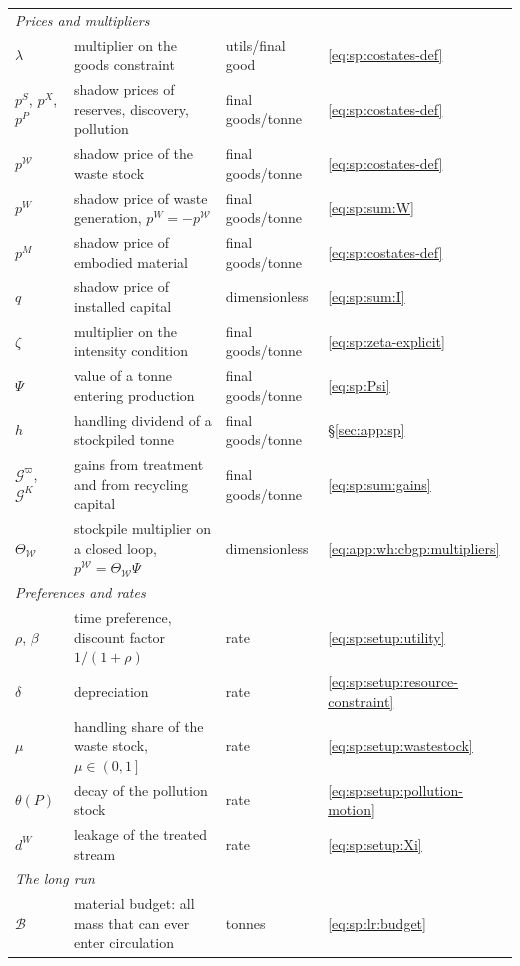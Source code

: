 \begin{center}
\begin{tabular}{llll}
\multicolumn{4}{l}{\textit{Prices and multipliers}}\\
$\lambda$ & multiplier on the goods constraint & utils/final good & \eqref{eq:sp:costates-def}\\
$p^S$, $p^X$, $p^P$ & shadow prices of reserves, discovery, pollution & final goods/tonne & \eqref{eq:sp:costates-def}\\
$p^{\mathcal W}$ & shadow price of the waste stock & final goods/tonne & \eqref{eq:sp:costates-def}\\
$p^W$ & shadow price of waste generation, $p^W=-p^{\mathcal W}$ & final goods/tonne & \eqref{eq:sp:sum:W}\\
$p^M$ & shadow price of embodied material & final goods/tonne & \eqref{eq:sp:costates-def}\\
$q$ & shadow price of installed capital & dimensionless & \eqref{eq:sp:sum:I}\\
$\zeta$ & multiplier on the intensity condition & final goods/tonne & \eqref{eq:sp:zeta-explicit}\\
$\Psi$ & value of a tonne entering production & final goods/tonne & \eqref{eq:sp:Psi}\\
$h$ & handling dividend of a stockpiled tonne & final goods/tonne & \S\ref{sec:app:sp}\\
$\mathcal G^{\varpi}$, $\mathcal G^{K}$ & gains from treatment and from recycling capital & final goods/tonne & \eqref{eq:sp:sum:gains}\\
$\Theta_{\mathcal W}$ & stockpile multiplier on a closed loop, $p^{\mathcal W}=\Theta_{\mathcal W}\Psi$ & dimensionless & \eqref{eq:app:wh:cbgp:multipliers}\\
\multicolumn{4}{l}{\textit{Preferences and rates}}\\
$\rho$, $\beta$ & time preference, discount factor $1/(1+\rho)$ & rate & \eqref{eq:sp:setup:utility}\\
$\delta$ & depreciation & rate & \eqref{eq:sp:setup:resource-constraint}\\
$\mu$ & handling share of the waste stock, $\mu\in\left(0,1\right]$ & rate & \eqref{eq:sp:setup:wastestock}\\
$\theta(P)$ & decay of the pollution stock & rate & \eqref{eq:sp:setup:pollution-motion}\\
$d^W$ & leakage of the treated stream & rate & \eqref{eq:sp:setup:Xi}\\
\multicolumn{4}{l}{\textit{The long run}}\\
$\mathcal B$ & material budget: all mass that can ever enter circulation & tonnes & \eqref{eq:sp:lr:budget}\\

\end{tabular}
\end{center}
